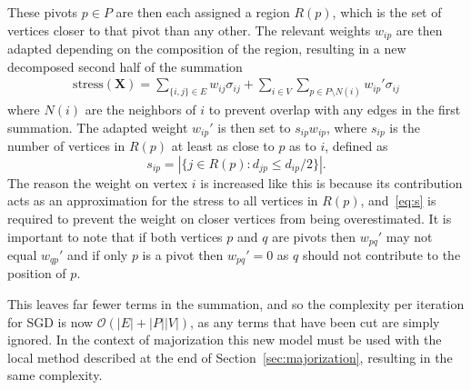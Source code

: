 These pivots $p\in P$ are then each assigned a region $R(p)$, which is the set of vertices closer to that pivot than any other. The relevant weights $w_{ip}$ are then adapted depending on the composition of the region, resulting in a new decomposed second half of the summation
\begin{equation}
  \begin{split}
  \text{stress}(\mathbf{X}) = \sum_{\{i,j\}\in E}w_{ij}\sigma_{ij}
  + \sum_{i\in V}\sum_{p\in P\setminus N(i)}w_{ip}'\sigma_{ij}
  \end{split}
  \label{eq:pivot_stress}
\end{equation}
where $N(i)$ are the neighbors of $i$ to prevent overlap with any edges in the first summation.
The adapted weight $w_{ip}'$ is then set to $s_{ip} w_{ip}$, where $s_{ip}$ is the number of vertices in $R(p)$ at least as close to $p$ as to $i$, defined as
\begin{equation}
  s_{ip}=|\{j\in R(p): d_{jp} \leq d_{ip}/2\}|.
  \label{eq:s}
\end{equation}
The reason the weight on vertex $i$ is increased like this is because its contribution acts as an approximation for the stress to all vertices in $R(p)$, and~\eqref{eq:s} is required to prevent the weight on closer vertices from being overestimated.
It is important to note that if both vertices $p$ and $q$ are pivots then $w_{pq}'$ may not equal $w_{qp}'$ and if only $p$ is a pivot then $w_{pq}'=0$ as $q$ should not contribute to the position of $p$.

This leaves far fewer terms in the summation, and so the complexity per iteration for SGD is now $\mathcal{O}(|E| + |P||V|)$, as any terms that have been cut are simply ignored. In the context of majorization this new model must be used with the local method described at the end of Section~\ref{sec:majorization}, resulting in the same complexity.

